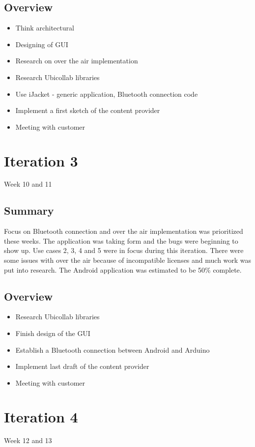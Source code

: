 \subsection{Overview}
\begin{itemize}
	\item{Think architectural}
	\item{Designing of GUI}
	\item{Research on over the air implementation}
	\item{Research Ubicollab libraries}
	\item{Use iJacket - generic application, Bluetooth connection code}
	\item{Implement a first sketch of the content provider}
	\item{Meeting with customer}
\end{itemize}

\section{Iteration 3}
Week 10 and 11
\subsection{Summary}
	Focus on Bluetooth connection and over the air implementation was prioritized these weeks. The application was taking form and the bugs were beginning to show up. Use cases 2, 3, 4 and 5 were in focus during this iteration. There were some issues with over the air because of incompatible licenses and much work was put into research. The Android application was estimated to be 50\% complete.

\subsection{Overview}
\begin{itemize}
	\item{Research Ubicollab libraries}
	\item{Finish design of the GUI}
	\item{Establish a Bluetooth connection between Android and Arduino}
	\item{Implement last draft of the content provider}
	\item{Meeting with customer}
\end{itemize}

\section{Iteration 4}\label{sec:Iteration4}
Week 12 and 13
